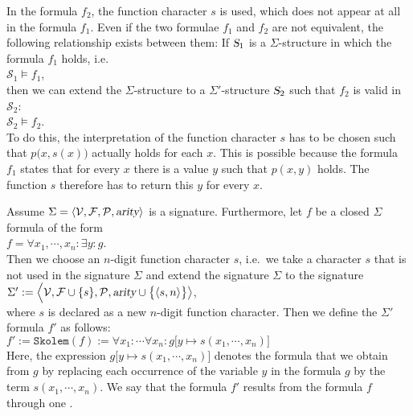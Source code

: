 In the formula $f_2$, the function character $s$
is used, which does not appear at all in the formula $f_1$. 
Even if the two formulae $f_1$ and $f_2$ are not equivalent, the following relationship exists between them: If
$\textsl{S}_1$ is a 
$\Sigma$-structure in which the formula $f_1$ holds, i.e.
\\[0.2cm]
\hspace*{1.3cm}
$\mathcal{S}_1 \models f_1$,
\\[0.2cm]
then we can extend the $\Sigma$-structure to a $\Sigma'$-structure  $\textsl{S}_2$ such that
$f_2$ is valid in $\mathcal{S}_2$:
\\[0.2cm]
\hspace*{1.3cm}
$\mathcal{S}_2 \models f_2$.
\\[0.2cm]
To do this, the interpretation of the function character $s$ has to be chosen such that
$p\bigl(x,s(x)\bigr)$ actually holds for each $x$.  This is possible because the formula $f_1$ states 
that for every $x$ there is a value $y$ such that $p(x,y)$ holds.  The function $s$ therefore has to 
return this $y$ for every $x$. 

\begin{Definition} \hspace*{\fill} \linebreak
  Assume $\Sigma = \langle \mathcal{V}, \mathcal{F}, \mathcal{P}, \textsl{arity} \rangle$
  is a signature.  Furthermore, let $f$ be a closed $\Sigma$ formula of the form \\[0.2cm]
  \hspace*{1.3cm} 
  $f = \forall x_1, \cdots, x_n \colon \exists y \colon g$. \\[0.2cm]
  Then we choose an \underline{} $n$-digit function character $s$, i.e.~we take a character $s$ that
  is not used in the  signature $\Sigma$ and extend the signature $\Sigma$ to the signature \\[0.2cm]
  \hspace*{1.3cm} 
  $\Sigma' := \Bigl\langle \mathcal{V}, \mathcal{F} \cup \{s\}, \mathcal{P}, \textsl{arity} \cup \bigl\{\pair(s,n)\bigr\} \bigr\rangle$, \\[0.2cm]
  where $s$ is declared as a new $n$-digit function character.  Then we define the $\Sigma'$ formula
  $f'$ as follows: \\[0.2cm]
  \hspace*{1.3cm} 
  $f' := \mathtt{Skolem}(f) := 
  \forall x_1 \colon \cdots \forall x_n \colon g\bigl[y \mapsto s(x_1,\cdots,x_n)\bigr]$
  \\[0.2cm]
  Here, the expression $g\bigl[y \mapsto s(x_1,\cdots,x_n)\bigr]$ denotes the formula that we obtain from $g$
  by replacing each occurrence of the variable $y$ in the formula $g$ by the term
  $s(x_1,\cdots,x_n)$.  We say that the formula $f'$ results from the formula $f$  through one . 
  \eox
\end{Definition}

